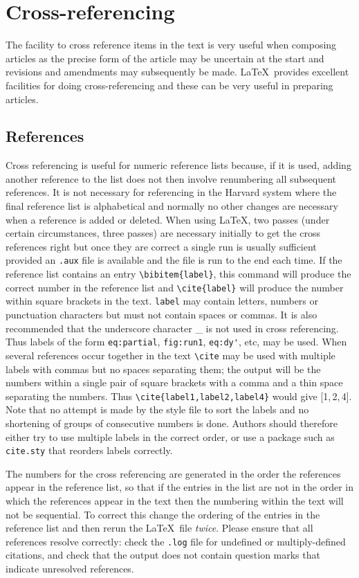 \documentclass[12pt]{iopart}
\begin{document}
\section{Cross-referencing\label{xrefs}}
The facility to cross reference items in the text is very useful when 
composing articles as the precise form of the article may be uncertain at the start 
and  revisions and amendments may subsequently be made. 
\LaTeX\ provides excellent facilities for doing cross-referencing
and these can be very useful in preparing articles.

\subsection{References}
\label{refs}
Cross referencing is useful for numeric reference lists because, if it 
is used, adding 
another reference to the list does not then involve renumbering all 
subsequent references. It is not necessary for referencing 
in the Harvard system where the final reference list is alphabetical 
and normally no other changes are necessary when a reference is added or
deleted.
When using \LaTeX , two passes (under certain circumstances, three passes)
are necessary initially to get the cross references right 
but once they are correct a single run is usually sufficient provided an 
\verb".aux" file is available and the file 
is run to the end each time.
If the 
reference list contains an entry \verb"\bibitem{label}", 
this command 
will produce the correct number in the reference list and 
\verb"\cite{label}" will produce the number within square brackets in the 
text. \verb"label" may contain letters, numbers 
or punctuation characters but must not contain spaces or commas. It is also
recommended that the underscore character \_{} is not used in cross
referencing. 
Thus labels of the form 
\verb"eq:partial", \verb"fig:run1", \verb"eq:dy'", 
etc, may be used. When several 
references occur together in the text \verb"\cite" may be used with 
multiple labels with commas but no spaces separating them; 
the output will be the 
numbers within a single pair of square brackets with a comma and a 
thin space separating the numbers. Thus \verb"\cite{label1,label2,label4}"
would give [1,\,2,\,4]. Note that no attempt is made by the style file to sort the 
labels and no shortening of groups of consecutive numbers is done.
Authors should therefore either try to use multiple labels in the correct 
order, or use a package such as \verb"cite.sty" that reorders labels
correctly.

The numbers for the cross referencing are generated in the order the 
references appear in the reference list, so that if the entries in the 
list are not in the order in which the references appear in the text 
then the 
numbering within the text will not be sequential. To correct this 
change the ordering of the entries in the reference list and then 
rerun the \LaTeX\ file {\it twice}.  Please ensure that all references resolve correctly: check the \verb".log" file
for undefined or multiply-defined citations, and check that the output does not contain question
marks that indicate unresolved references.
\end{document}
